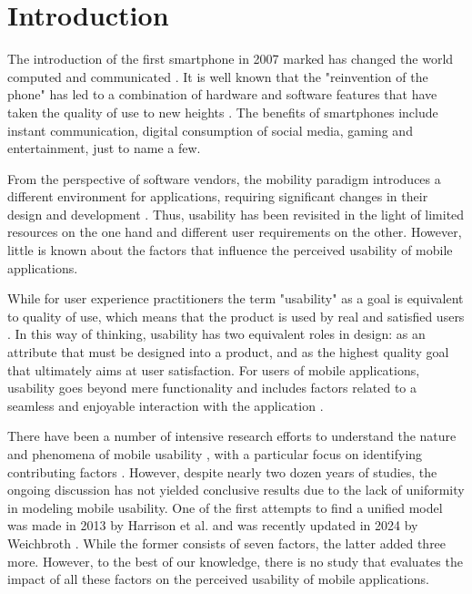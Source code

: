 \documentclass[preprint,12pt]{elsarticle}
\begin{document}
\section{Introduction}
\label{sec:introduction}
The introduction of the first smartphone in 2007 marked has changed the world computed and communicated \cite{ens2012guidelines}. It is well known that the "reinvention of the phone" has led to a combination of hardware and software features that have taken the quality of use to new heights \cite{moumane2016usability}. The benefits of smartphones include instant communication, digital consumption of social media, gaming and entertainment, just to name a few.

From the perspective of software vendors, the mobility paradigm introduces a different environment for applications, requiring significant changes in their design and development \cite{lee2004mobile, wasserman2010software}. Thus, usability has been revisited in the light of limited resources on the one hand and different user requirements on the other. However, little is known about the factors that influence the perceived usability of mobile applications.

While for user experience practitioners the term "usability" as a goal is equivalent to quality of use, which means that the product is used by real and satisfied users \cite{nascimento2016userbility, jeddi2020usability}. 
In this way of thinking, usability has two equivalent roles in design: as an attribute that must be designed into a product, and as the highest quality goal that ultimately aims at user satisfaction. For users of mobile applications, usability goes beyond mere functionality and includes factors related to a seamless and enjoyable interaction with the application \cite{adu2020development, manzano2023usability, shinozaki2024usability}. 

There have been a number of intensive research efforts to understand the nature and phenomena of mobile usability \cite{aryana2013mobile, da2019set, kivijarvi2023instrumental}, with a particular focus on identifying contributing factors \cite{ham2006conceptual, baharuddin2013usability, ghazizadeh2017quantitative}. 
However, despite nearly two dozen years of studies, the ongoing discussion has not yielded conclusive results due to the lack of uniformity in modeling mobile usability. One of the first attempts to find a unified model was made in 2013 by Harrison et al. \cite{harrison2013usability} and was recently updated in 2024 by Weichbroth \cite{weichbroth2024usability}. While the former consists of seven factors, the latter added three more. However, to the best of our knowledge, there is no study that evaluates the impact of all these factors on the perceived usability of mobile applications.
\end{document}
